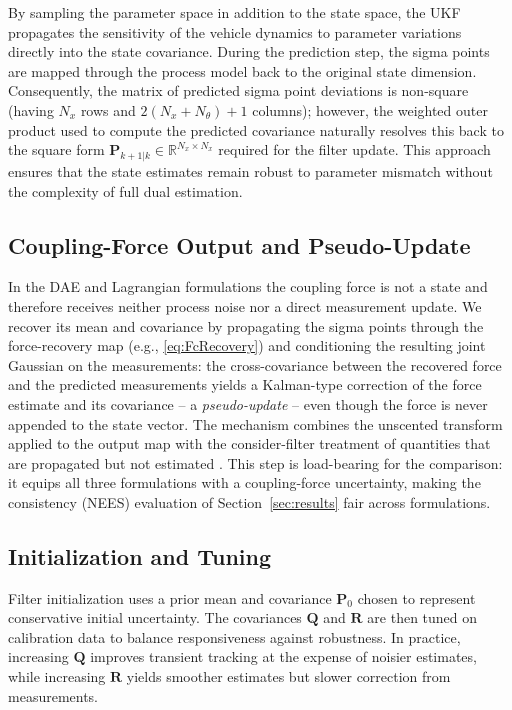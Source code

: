 \documentclass[conference]{IEEEtran}
\begin{document}
By sampling the parameter space in addition to the state space, the UKF propagates the sensitivity of the vehicle dynamics to parameter variations directly into the state covariance. During the prediction step, the sigma points are mapped through the process model back to the original state dimension. Consequently, the matrix of predicted sigma point deviations is non-square (having $N_x$ rows and $2(N_x + N_\theta) + 1$ columns); however, the weighted outer product used to compute the predicted covariance naturally resolves this back to the square form $\bm P_{k+1|k} \in \mathbb{R}^{N_x \times N_x}$ required for the filter update. This approach ensures that the state estimates remain robust to parameter mismatch without the complexity of full dual estimation.

\subsection{Coupling-Force Output and Pseudo-Update}
\label{sec:pseudoupdate}
In the DAE and Lagrangian formulations the coupling force is not a state and therefore receives neither process noise nor a direct measurement update. We recover its mean and covariance by propagating the sigma points through the force-recovery map (e.g., \eqref{eq:FcRecovery}) and conditioning the resulting joint Gaussian on the measurements: the cross-covariance between the recovered force and the predicted measurements yields a Kalman-type correction of the force estimate and its covariance -- a \emph{pseudo-update} -- even though the force is never appended to the state vector. The mechanism combines the unscented transform applied to the output map \cite{julier_new_1997} with the consider-filter treatment of quantities that are propagated but not estimated \cite{woodbury_consider_2010, stauch_unscented_2015}.
This step is load-bearing for the comparison: it equips all three formulations with a coupling-force uncertainty, making the consistency (NEES) evaluation of Section~\ref{sec:results} fair across formulations.

\subsection{Initialization and Tuning}
Filter initialization uses a prior mean and covariance $\bm P_0$ chosen to represent conservative initial uncertainty. The covariances $\bm Q$ and $\bm R$ are then tuned on calibration data to balance responsiveness against robustness. In practice, increasing $\bm Q$ improves transient tracking at the expense of noisier estimates, while increasing $\bm R$ yields smoother estimates but slower correction from measurements.
\end{document}
